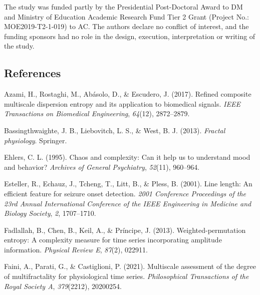 \documentclass[
  man]{apa6}
\newlength{\cslhangindent}
\newlength{\cslentryspacingunit} %
\newenvironment{CSLReferences}[2] %
 {%
  \setlength{\parindent}{0pt}
  \ifodd #1
  \let\oldpar\par
  \def\par{\hangindent=\cslhangindent\oldpar}
  \fi
  \setlength{\parskip}{#2\cslentryspacingunit}
 }%
 {}
\begin{document}
The study was funded partly by the Presidential Post-Doctoral Award to DM and Ministry of Education Academic Research Fund Tier 2 Grant (Project No.: MOE2019-T2-1-019) to AC. The authors declare no conflict of interest, and the funding sponsors had no role in the design, execution, interpretation or writing of the study.

\newpage

\hypertarget{references}{%
\subsection{References}\label{references}}

\hypertarget{refs}{}
\begin{CSLReferences}{1}{0}
\leavevmode{}%
Azami, H., Rostaghi, M., Abásolo, D., \& Escudero, J. (2017). Refined composite multiscale dispersion entropy and its application to biomedical signals. \emph{IEEE Transactions on Biomedical Engineering}, \emph{64}(12), 2872--2879.

\leavevmode{}%
Bassingthwaighte, J. B., Liebovitch, L. S., \& West, B. J. (2013). \emph{Fractal physiology}. Springer.

\leavevmode{}%
Ehlers, C. L. (1995). Chaos and complexity: Can it help us to understand mood and behavior? \emph{Archives of General Psychiatry}, \emph{52}(11), 960--964.

\leavevmode{}%
Esteller, R., Echauz, J., Tcheng, T., Litt, B., \& Pless, B. (2001). Line length: An efficient feature for seizure onset detection. \emph{2001 Conference Proceedings of the 23rd Annual International Conference of the IEEE Engineering in Medicine and Biology Society}, \emph{2}, 1707--1710.

\leavevmode{}%
Fadlallah, B., Chen, B., Keil, A., \& Príncipe, J. (2013). Weighted-permutation entropy: A complexity measure for time series incorporating amplitude information. \emph{Physical Review E}, \emph{87}(2), 022911.

\leavevmode{}%
Faini, A., Parati, G., \& Castiglioni, P. (2021). Multiscale assessment of the degree of multifractality for physiological time series. \emph{Philosophical Transactions of the Royal Society A}, \emph{379}(2212), 20200254.


\end{CSLReferences}
\end{document}
